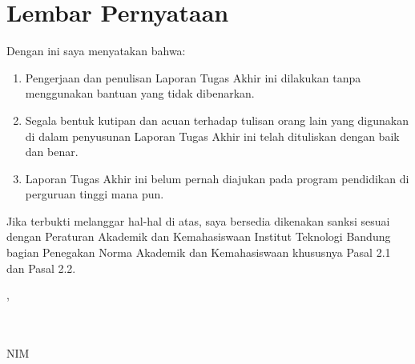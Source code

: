\begingroup
\titlespacing*{\chapter}{0pt}{57pt}{4em}
\chapter*{Lembar Pernyataan}
\endgroup

Dengan ini saya menyatakan bahwa:

\begin{enumerate}[topsep=0.3em,itemsep=0.25em]
    \item Pengerjaan dan penulisan Laporan Tugas Akhir ini dilakukan tanpa menggunakan bantuan yang tidak dibenarkan.
    \item Segala bentuk kutipan dan acuan terhadap tulisan orang lain yang digunakan di dalam penyusunan Laporan Tugas Akhir ini telah dituliskan dengan baik dan benar.
    \item Laporan Tugas Akhir ini belum pernah diajukan pada program pendidikan di perguruan tinggi mana pun.
\end{enumerate}

\vspace{0.2em}

Jika terbukti melanggar hal-hal di atas, saya bersedia dikenakan sanksi sesuai dengan Peraturan Akademik dan Kemahasiswaan Institut Teknologi Bandung bagian Penegakan Norma Akademik dan Kemahasiswaan khususnya Pasal 2.1 dan Pasal 2.2.

\vspace{14mm}

\begin{flushleft}
    \SubmissionCity, \ApprovalDate

    \vspace{0.3cm}
    \AuthorSignature\\[-0.2cm]
    \AuthorName \\
    NIM \StudentID
\end{flushleft}
